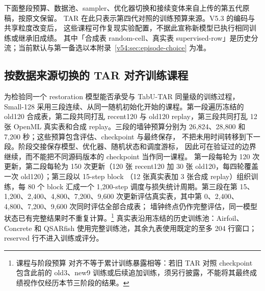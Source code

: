 \documentclass[11pt,UTF8,fontset=fandol]{ctexart}
\numberwithin{equation}{section}
\theoremstyle{definition}
\begin{document}
\begin{vfivebox}
下面整段预算、数据池、sampler、优化器切换和接续变体来自上传的第五代原稿，按原文保留。
TAR 在此只表示第四代对照的训练预算来源。V5.3 的编码与共享粒度改变后，
这些课程可作复现实验配置，不据此宣称新模型已执行相同训练或继承旧成绩。
其中「合成表 random-cell、真实表 supervised-row」是历史分流；当前默认与第一备选以本附录~\ref{v54:sec:episode-choice} 为准。
\end{vfivebox}
\subsection{按数据来源切换的 TAR 对齐训练课程}
为检验同一个 restoration 模型能否承受与 TabU-TAR 同量级的训练过程，
Small-128 采用三段连续、从同一随机初始化开始的课程。第一段遍历冻结的
old120 合成表，第二段共同打乱 recent120 与 old120 replay，第三段共同打乱
12 张 OpenML 真实表和合成 replay。三段的墙钟预算分别为
26,824、28,800 和 7,200 秒；这些预算包含评估、checkpoint 与最终保存，
不把未用时间转移到下一段。阶段交接保存模型、优化器、随机状态和调度游标，
因此可在验证过的边界继续，而不能把不同源码版本的 checkpoint 当作同一课程。
第一段每轮为 120 次更新，第二段每轮为 150 次更新（120 张 recent120
加 30 张 old120，每四轮覆盖一次 old120）；第三段以 15-step block
（12 张真实表加 3 张合成 replay）组织训练，每 80 个 block 汇成一个
1,200-step 调度与损失统计周期。第三段在第 15、1,200、2,400、4,800、7,200、9,600
次更新评估真实表，其中第 0、2,400、4,800、7,200、9,600 次同时评估全部合成表；
墙钟终点仍作完整评估，同一模型状态已有完整结果时不重复计算。\footnote{课程与阶段预算
对齐不等于累计训练暴露相等：若旧 TAR 对照 checkpoint 包含此前的 old3、new9
训练或后续追加训练，须另行披露，不能将其最终成绩视作仅经历本节三阶段的结果。}
真实表沿用冻结的历史训练池：Airfoil、Concrete 和
QSARfish 使用完整训练池，其余九表使用既定的至多 204 行窗口；reserved
行不进入训练或评分。
\end{document}
